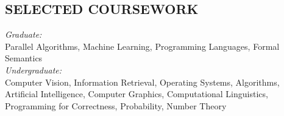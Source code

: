 \documentclass[line,margin]{res}
\begin{document}
\begin{resume}
\section{SELECTED COURSEWORK} {\sl Graduate:} \\ Parallel Algorithms, Machine Learning, Programming Languages, Formal Semantics \\
															{\sl Undergraduate:} \\ Computer Vision, Information Retrieval, Operating Systems, Algorithms, 
															Artificial Intelligence, Computer Graphics, Computational Linguistics, Programming for Correctness, 
															Probability, Number Theory \\

                           
\iffalse
\section{EXTRA-CURRICULAR \\ ACTIVITIES}            
								{\sl Recipient,} Chevron Scholarship (2012) \\
								{\sl Recipient,} Tracor/Frank McBee, Jr. Scholarship (2011) \\
                Association for Computing Machinery \\
								Undergraduate Philosophy Association \\
								Longhorn Billiards Club
                \fi
\end{resume}
\end{document}
